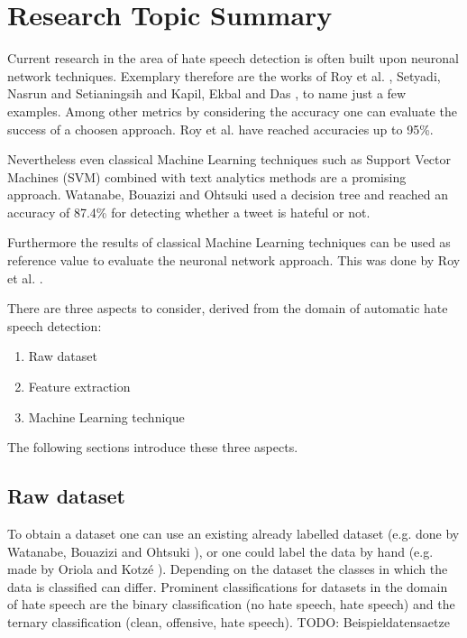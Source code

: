 \section{Research Topic Summary}

Current research in the area of hate speech detection is often built upon neuronal network techniques. Exemplary therefore are the works of Roy et al. \cite{9253658}, Setyadi, Nasrun and Setianingsih \cite{8712109} and Kapil, Ekbal and Das \cite{kapil2020investigating}, to name just a few examples. Among other metrics by considering the accuracy one can evaluate the success of a choosen approach. Roy et al. \cite{9253658} have reached accuracies up to 95\%.

Nevertheless even classical Machine Learning techniques such as Support Vector Machines (SVM) combined with text analytics methods are a promising approach.
Watanabe, Bouazizi and Ohtsuki \cite{8292838} used a decision tree and reached an accuracy of 87.4\% for detecting whether a tweet is hateful or not.

Furthermore the results of classical Machine Learning techniques can be used as reference value to evaluate the neuronal network approach. This was done by Roy et al. \cite{9253658}.

There are three aspects to consider, derived from the domain of automatic hate speech detection:
\begin{enumerate}
	\item Raw dataset
	\item Feature extraction
	\item Machine Learning technique
\end{enumerate}

The following sections introduce these three aspects.

\subsection{Raw dataset}
To obtain a dataset one can use an existing already labelled dataset (e.g. done by Watanabe, Bouazizi and Ohtsuki \cite{8292838}), or one could label the data by hand (e.g. made by Oriola and Kotz\'{e} \cite{8963960}).
Depending on the dataset the classes in which the data is classified can differ. Prominent classifications for datasets in the domain of hate speech are the binary classification (no hate speech, hate speech) and the ternary classification (clean, offensive, hate speech). 
TODO: Beispieldatensaetze

